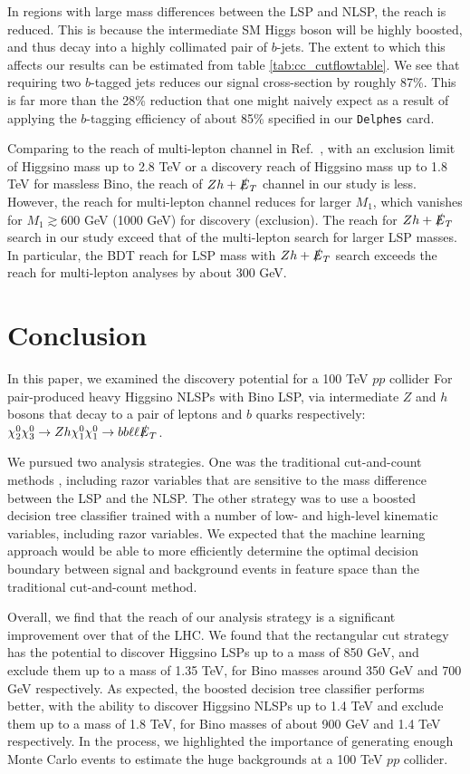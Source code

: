 \documentclass[a4paper,11pt]{article}
\newcommand{\met}{{\slashed{E}_T}}
\begin{document}
In regions with large mass differences between the LSP and NLSP, the reach is
reduced.  This is because the intermediate SM Higgs boson will be highly boosted, and
thus decay into a highly collimated pair of $b$-jets. The extent to which this
affects our results can be estimated from table \ref{tab:cc_cutflowtable}. We
see that requiring two $b$-tagged jets reduces our signal cross-section by
roughly 87\%. This is far more than the 28\% reduction that one might naively
expect as a result of applying the $b$-tagging efficiency of about 85\%
specified in our \texttt{Delphes} card.  
 
Comparing to the reach of multi-lepton channel in Ref.~\cite{Gori:2014oua},
with an  exclusion limit of Higgsino mass up to 2.8 TeV or a discovery reach
of Higgsino mass up to 1.8 TeV for massless Bino, the reach of $Zh+\met$
channel in our study is less.  However, the reach for multi-lepton channel
reduces for larger $M_1$, which vanishes for $M_1\gtrsim 600$ GeV (1000 GeV)
for discovery (exclusion).   The reach for $Zh+\met$ search in our study
exceed that of the multi-lepton search for larger LSP masses.  In particular,
the BDT reach for LSP mass with $Zh+\met$ search exceeds the reach for
multi-lepton analyses by about 300 GeV.  



\section{Conclusion}\label{sec:conclusion}

In this paper, we examined the discovery potential for a 100 TeV $pp$ collider
For pair-produced heavy Higgsino NLSPs with Bino LSP, via intermediate $Z$ and
$h$ bosons that decay to a pair of leptons and $b$ quarks respectively:
$\chi_2^0\chi_3^0\rightarrow Zh \chi_1^0\chi_1^0\rightarrow bb\ell\ell \met$.

We pursued two analysis strategies. One was the traditional cut-and-count methods , including razor variables
that are sensitive to the mass difference between the LSP and the NLSP. The
other strategy was to use a boosted decision tree classifier trained with a
number of low- and high-level kinematic variables, including razor variables. We expected
that the machine learning approach would be able to more efficiently determine
the optimal decision boundary between signal and background events in feature
space than the traditional   cut-and-count method.

Overall, we find that the reach of our analysis strategy is a significant
improvement over that of the LHC. We found that the rectangular cut strategy has
the potential to discover Higgsino LSPs up to a mass of 850 GeV, and exclude
them up to a mass of 1.35 TeV, for Bino masses around 350 GeV and 700 GeV
respectively. 
As expected, the boosted decision tree classifier
performs better, with the ability to discover Higgsino NLSPs up to 1.4 TeV and
exclude them up to a mass of 1.8 TeV, for Bino masses of about 900 GeV and 1.4
TeV respectively.   In the
process, we highlighted the importance of generating enough Monte Carlo events
to estimate the huge backgrounds at a 100 TeV $pp$ collider.   
\end{document}
